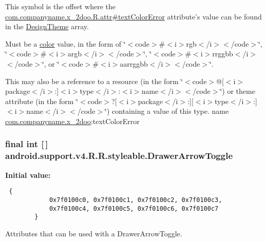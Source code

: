 This symbol is the offset where the \hyperlink{classcom_1_1companyname_1_1x__2doo_1_1_r_1_1attr_f8178821179df9f3f3dddffaa768eb89}{com.companyname.x\_\-2doo.R.attr\#textColorError} attribute's value can be found in the \hyperlink{classandroid_1_1support_1_1v4_1_1_r_1_1styleable_1fc2363c6b6b67c6e45666c3b79caadd}{DesignTheme} array.

Must be a \hyperlink{classandroid_1_1support_1_1v4_1_1_r_1_1color}{color} value, in the form of \char`\"{}$<$code$>$\#$<$i$>$rgb$<$/i$>$$<$/code$>$\char`\"{}, \char`\"{}$<$code$>$\#$<$i$>$argb$<$/i$>$$<$/code$>$\char`\"{}, \char`\"{}$<$code$>$\#$<$i$>$rrggbb$<$/i$>$$<$/code$>$\char`\"{}, or \char`\"{}$<$code$>$\#$<$i$>$aarrggbb$<$/i$>$$<$/code$>$\char`\"{}. 

This may also be a reference to a resource (in the form \char`\"{}$<$code$>$@\mbox{[}$<$i$>$package$<$/i$>$:\mbox{]}$<$i$>$type$<$/i$>$:$<$i$>$name$<$/i$>$$<$/code$>$\char`\"{}) or theme attribute (in the form \char`\"{}$<$code$>$?\mbox{[}$<$i$>$package$<$/i$>$:\mbox{]}\mbox{[}$<$i$>$type$<$/i$>$:\mbox{]}$<$i$>$name$<$/i$>$$<$/code$>$\char`\"{}) containing a value of this type.  name \hyperlink{namespacecom_1_1companyname_1_1x__2doo}{com.companyname.x\_\-2doo}:textColorError \hypertarget{classandroid_1_1support_1_1v4_1_1_r_1_1styleable_df2952a999161d3c408fb6267800afe6}{
\subsubsection[{DrawerArrowToggle}]{\setlength{\rightskip}{0pt plus 5cm}final int \mbox{[}$\,$\mbox{]} android.support.v4.R.R.styleable.DrawerArrowToggle}}
\label{classandroid_1_1support_1_1v4_1_1_r_1_1styleable_df2952a999161d3c408fb6267800afe6}


\textbf{Initial value:}

\begin{Code}\begin{verbatim} {
            0x7f0100c0, 0x7f0100c1, 0x7f0100c2, 0x7f0100c3,
            0x7f0100c4, 0x7f0100c5, 0x7f0100c6, 0x7f0100c7
        }
\end{verbatim}
\end{Code}
Attributes that can be used with a DrawerArrowToggle. 

